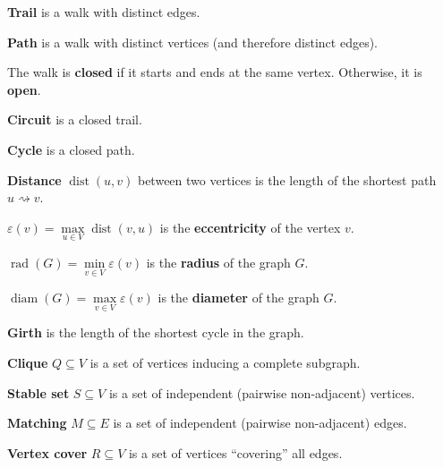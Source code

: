 \documentclass[a4paper,12pt]{article}
\newcommand{\op}[1]{\operatorname*{#1}}
\newcommand{\dist}[1]{\op{dist}(#1)}
\newcommand{\eccentricity}[1]{\varepsilon(#1)}
\newcommand{\graphRadius}[1]{\op{rad}(#1)}
\newcommand{\graphDiameter}[1]{\op{diam}(#1)}
\begin{document}
\begin{terms}
    \begin{terms}
        \item \textbf{Trail} is a walk with distinct edges.
        \item \textbf{Path} is a walk with distinct vertices (and therefore distinct edges).
        \item The walk is \textbf{closed} if it starts and ends at the same vertex. Otherwise, it is \textbf{open}.
        \item \textbf{Circuit} is a closed trail.
        \item \textbf{Cycle} is a closed path.
    \end{terms}

    \item \textbf{Distance} $\dist{u,v}$ between two vertices is the length of the shortest path $u \rightsquigarrow v$.

    \begin{terms}
        \item $\eccentricity{v} = \max\limits_{u \in V} \dist{v,u}$ is the \textbf{eccentricity} of the vertex $v$.
        \item $\graphRadius{G} = \min\limits_{v \in V} \eccentricity{v}$ is the \textbf{radius} of the graph $G$.
        \item $\graphDiameter{G} = \max\limits_{v \in V} \eccentricity{v}$ is the \textbf{diameter} of the graph $G$.
    \end{terms}

    \item \textbf{Girth} is the length of the shortest cycle in the graph.

    \item \textbf{Clique} $Q \subseteq V$ is a set of vertices inducing a complete subgraph.

    \item \textbf{Stable set} $S \subseteq V$ is a set of independent (pairwise non-adjacent) vertices.

    \item \textbf{Matching} $M \subseteq E$ is a set of independent (pairwise non-adjacent) edges.

    \item \textbf{Vertex cover} $R \subseteq V$ is a set of vertices \enquote{covering} all edges.


\end{terms}
\end{document}
